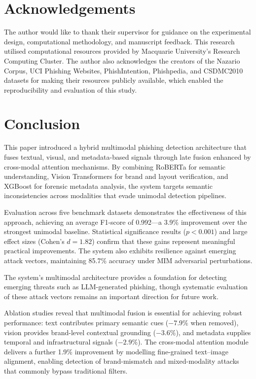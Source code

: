 \documentclass[conference]{IEEEtran}
\begin{document}
\section*{Acknowledgements}

The author would like to thank their supervisor for guidance on the experimental design, computational methodology, and manuscript feedback. This research utilised computational resources provided by Macquarie University's Research Computing Cluster. The author also acknowledges the creators of the Nazario Corpus, UCI Phishing Websites, PhishIntention, Phishpedia, and CSDMC2010 datasets for making their resources publicly available, which enabled the reproducibility and evaluation of this study.

\section{Conclusion}

This paper introduced a hybrid multimodal phishing detection architecture that fuses textual, visual, and metadata-based signals through late fusion enhanced by cross-modal attention mechanisms. By combining RoBERTa for semantic understanding, Vision Transformers for brand and layout verification, and XGBoost for forensic metadata analysis, the system targets semantic inconsistencies across modalities that evade unimodal detection pipelines.

Evaluation across five benchmark datasets demonstrates the effectiveness of this approach, achieving an average F1-score of 0.992---a 3.9\% improvement over the strongest unimodal baseline. Statistical significance results ($p < 0.001$) and large effect sizes (Cohen's $d = 1.82$) confirm that these gains represent meaningful practical improvements. The system also exhibits resilience against emerging attack vectors, maintaining 85.7\% accuracy under MIM adversarial perturbations.

The system's multimodal architecture provides a foundation for detecting emerging threats such as LLM-generated phishing, though systematic evaluation of these attack vectors remains an important direction for future work.

Ablation studies reveal that multimodal fusion is essential for achieving robust performance: text contributes primary semantic cues ($-7.9\%$ when removed), vision provides brand-level contextual grounding ($-3.6\%$), and metadata supplies temporal and infrastructural signals ($-2.9\%$). The cross-modal attention module delivers a further 1.9\% improvement by modelling fine-grained text--image alignment, enabling detection of brand-mismatch and mixed-modality attacks that commonly bypass traditional filters.
\end{document}
